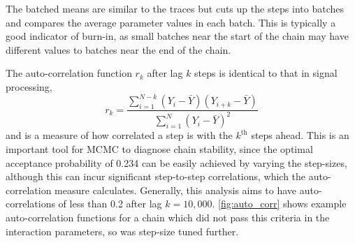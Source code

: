 The batched means are similar to the traces but cuts up the steps into batches and compares the average parameter values in each batch. This is typically a good indicator of burn-in, as small batches near the start of the chain may have different values to batches near the end of the chain.

The auto-correlation function $r_k$ after lag $k$ steps is identical to that in signal processing,
\begin{equation}
r_k = \frac{\sum_{i=1}^{N-k}\left(Y_i-\bar{Y}\right) \left(Y_{i+k} - \bar{Y}\right)} {\sum_{i=1}^N \left(Y_i-\bar{Y}\right)^2 }
\end{equation}
and is a measure of how correlated a step is with the $k^\text{th}$ steps ahead. This is an important tool for MCMC to diagnose chain stability, since the optimal acceptance probability of 0.234 can be easily achieved by varying the step-sizes, although this can incur significant step-to-step correlations, which the auto-correlation measure calculates. Generally, this analysis aims to have auto-correlations of less than 0.2 after lag $k=10,000$. \autoref{fig:auto_corr} shows example auto-correlation functions for a chain which did not pass this criteria in the interaction parameters, so was step-size tuned further.
